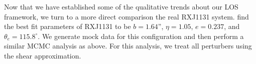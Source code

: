 Now that we have established some of the qualitative trends about our LOS framework, we turn to a more direct comparison the real RXJ1131 system. \citet{Suyu13} find the best fit parameters of RXJ1131 to be $b = 1.64$'', $\eta = 1.05$, $e = 0.237$, and $\theta_e = 115.8^{\circ}$. We generate mock data for this configuration and then perform a similar MCMC analysis as above. For this analysis, we treat all perturbers using the shear approximation.